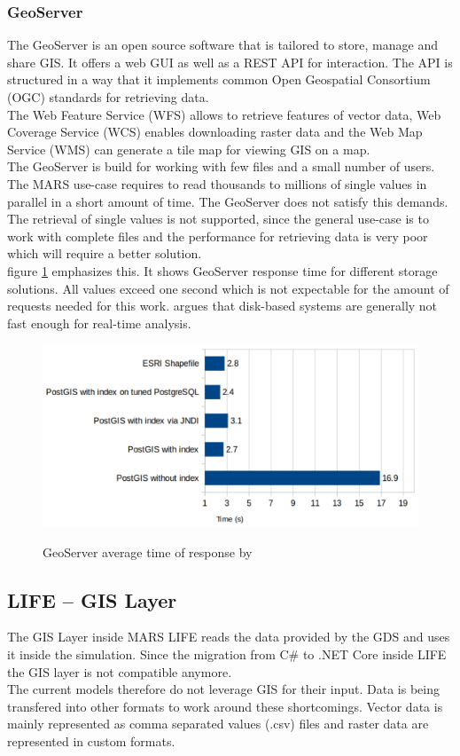 \subsubsection{GeoServer} \label{sec:GS}
The GeoServer is an open source software that is tailored to store, manage and share GIS. It offers a web GUI as well as a REST API for interaction. The API is structured in a way that it implements common Open Geospatial Consortium (OGC) standards for retrieving data.\\
The Web Feature Service (WFS) allows to retrieve features of vector data, Web Coverage Service (WCS) enables downloading raster data and the Web Map Service (WMS) can generate a tile map for viewing GIS on a map.\\
The GeoServer is build for working with few files and a small number of users. The MARS use-case requires to read thousands to millions of single values in parallel in a short amount of time. The GeoServer does not satisfy this demands. The retrieval of single values is not supported, since the general use-case is to work with complete files and the performance for retrieving data is very poor which will require a better solution.\\
figure \ref{img:gs-read-performance} emphasizes this. It shows GeoServer response time for different storage solutions. All values exceed one second which is not expectable for the amount of requests needed for this work. \cite{Pandey2016} argues that disk-based systems are generally not fast enough for real-time analysis.

\begin{figure}[H]
	\centering
	\includegraphics[width=0.8\columnwidth]{res/gs-read-performance}\\
	\caption[]{GeoServer average time of response by \cite{ruuvzivcka2016comparing}}
	\label{img:gs-read-performance}
\end{figure}

\subsection{LIFE -- GIS Layer}
The GIS Layer inside MARS LIFE reads the data provided by the GDS and uses it inside the simulation. Since the migration from C\# to .NET Core inside LIFE the GIS layer is not compatible anymore.\\
The current models therefore do not leverage GIS for their input. Data is being transfered into other formats to work around these shortcomings. Vector data is mainly represented as comma separated values (.csv) files and raster data are represented in custom formats.


